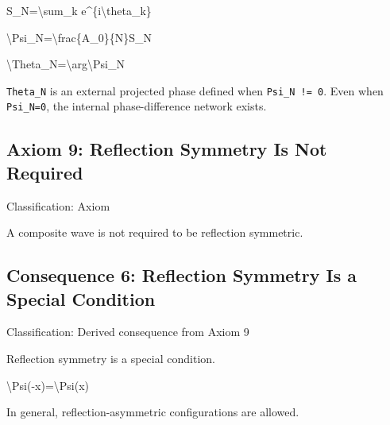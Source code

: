 \documentclass[
  a4paper,
]{article}
\newenvironment{Shaded}{}{}
\newcommand{\NormalTok}[1]{#1}
\begin{document}
\begin{Shaded}
\begin{Highlighting}[]
\NormalTok{S\_N=\textbackslash{}sum\_k e\^{}\{i\textbackslash{}theta\_k\}}
\end{Highlighting}
\end{Shaded}

\begin{Shaded}
\begin{Highlighting}[]
\NormalTok{\textbackslash{}Psi\_N=\textbackslash{}frac\{A\_0\}\{N\}S\_N}
\end{Highlighting}
\end{Shaded}

\begin{Shaded}
\begin{Highlighting}[]
\NormalTok{\textbackslash{}Theta\_N=\textbackslash{}arg\textbackslash{}Psi\_N}
\end{Highlighting}
\end{Shaded}

\texttt{Theta\_N} is an external projected phase defined when
\texttt{Psi\_N\ !=\ 0}. Even when \texttt{Psi\_N=0}, the internal
phase-difference network exists.

\subsection{Axiom 9: Reflection Symmetry Is Not
Required}\label{axiom-9-reflection-symmetry-is-not-required}

Classification: Axiom

A composite wave is not required to be reflection symmetric.

\subsection{Consequence 6: Reflection Symmetry Is a Special
Condition}\label{consequence-6-reflection-symmetry-is-a-special-condition}

Classification: Derived consequence from Axiom 9

Reflection symmetry is a special condition.

\begin{Shaded}
\begin{Highlighting}[]
\NormalTok{\textbackslash{}Psi({-}x)=\textbackslash{}Psi(x)}
\end{Highlighting}
\end{Shaded}

In general, reflection-asymmetric configurations are allowed.
\end{document}
